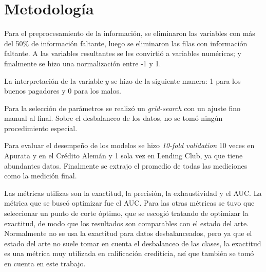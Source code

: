 \section{Metodología}

Para el preprocesamiento de la información, se eliminaron las variables con más del 50\% de información faltante, luego se eliminaron las filas con información faltante. A las variables resultantes se les convirtió a variables numéricas; y finalmente se hizo una normalización entre -1 y 1.

La interpretación de la variable $y$ se hizo de la siguiente manera: 1 para los buenos pagadores y 0 para los malos.

Para la selección de parámetros se realizó un \textit{grid-search} con un ajuste fino manual al final. Sobre el desbalanceo de los datos, no se tomó ningún procedimiento especial.

Para evaluar el desempeño de los modelos se hizo \textit{10-fold validation} 10 veces en Apurata y en el Crédito Alemán y 1 sola vez en Lending Club, ya que tiene abundantes datos. Finalmente se extrajo el promedio de todas las mediciones como la medición final.

Las métricas utilizas son la exactitud, la precisión, la exhaustividad y el \ac{AUC}. La métrica que se buscó optimizar fue el \ac{AUC}. Para las otras métricas se tuvo que seleccionar un punto de corte óptimo, que se escogió tratando de optimizar la exactitud, de modo que los resultados son comparables con el estado del arte. Normalmente no se usa la exactitud para datos desbalanceados, pero ya que el estado del arte no suele tomar en cuenta el desbalanceo de las clases, la exactitud es una métrica muy utilizada en calificación crediticia, así que también se tomó en cuenta en este trabajo.


